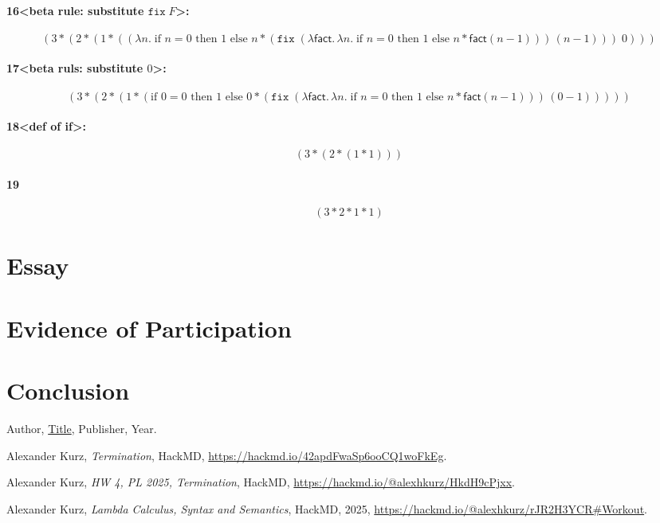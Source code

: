 \documentclass{article}
\theoremstyle{theorem}
\theoremstyle{definition}
\theoremstyle{remark}
\begin{document}
\paragraph{16\textless beta rule: substitute \(\texttt{fix}\;F\)\textgreater:}
\[
(3 * (2 * (1 * ((\lambda n.\; \text{if } n=0 \text{ then } 1 \text{ else } n * (\texttt{fix}\;(\lambda \mathsf{fact}.\,\lambda n.\; \text{if } n=0 \text{ then } 1 \text{ else } n * \mathsf{fact}(n-1)))\,(n-1)))\;0)))
\]

\paragraph{17\textless beta ruls: substitute \(0\)\textgreater:}
\[
(3 * (2 * (1 * (\text{if } 0=0 \text{ then } 1 \text{ else } 0 * (\texttt{fix}\;(\lambda \mathsf{fact}.\,\lambda n.\; \text{if } n=0 \text{ then } 1 \text{ else } n * \mathsf{fact}(n-1)))\,(0-1)))))
\]

\paragraph{18\textless def of if\textgreater:}
\[
(3 * (2 * (1 * 1)))
\]

\paragraph{19}
\[
(3 * 2 * 1 * 1)
\]


 
\section{Essay}

\section{Evidence of Participation}

\section{Conclusion}\label{conclusion}

\begin{thebibliography}{99}
 Author, \href{https://en.wikipedia.org/wiki/LaTeX}{Title}, Publisher, Year.

 Alexander Kurz, \emph{Termination}, HackMD, \url{https://hackmd.io/42apdFwaSp6ooCQ1woFkEg}.

 Alexander Kurz, \emph{HW 4, PL 2025, Termination}, HackMD, \url{https://hackmd.io/@alexhkurz/HkdH9cPjxx}.

 Alexander Kurz, \emph{Lambda Calculus, Syntax and Semantics}, HackMD, 2025, \url{https://hackmd.io/@alexhkurz/rJR2H3YCR#Workout}.

\end{thebibliography}
\end{document}
